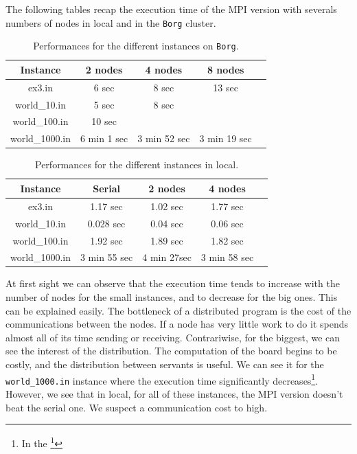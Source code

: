 \documentclass[a4paper,10pt]{article}
\begin{document}
The following tables recap the execution time of the MPI version with severals numbers of nodes in local and in the \texttt{Borg} cluster.
\begin{table}[!ht]
\centering
\begin{tabular}{|c||c|c|c|c|}
  \hline
    Instance     &  2 nodes   & 4 nodes  & 8 nodes  \\
  \hline
    ex3.in       &    6 sec       & 8 sec       &  13 sec \\ 
  \hline
    world\_10.in &    5 sec      & 8 sec      &  \\ 
  \hline
   world\_100.in &    10 sec     &      &  \\ 
  \hline
  world\_1000.in &     6 min 1 sec   & 3 min 52 sec      & 3 min 19 sec  \\ 
  \hline
\end{tabular}
\caption{Performances for the different instances on \texttt{Borg}.}
\end{table}

\begin{table}[!ht]
\centering
\begin{tabular}{|c||c|c|c|c|}
  \hline
    Instance     & Serial   & 2 nodes   & 4 nodes   \\
  \hline
    ex3.in       &    1.17 sec   &  1.02 sec  & 1.77 sec  \\ 
  \hline
    world\_10.in &    0.028 sec   &  0.04 sec      & 0.06 sec   \\ 
  \hline
   world\_100.in &    1.92 sec   &   1.89 sec     &  1.82 sec   \\ 
  \hline
  world\_1000.in &    3 min 55 sec  &    4 min 27sec   & 3 min 58 sec   \\ 
  \hline
\end{tabular}
\caption{Performances for the different instances in local.}
\end{table}


At first sight we can observe that the execution time tends to increase with the number of nodes for the small instances, and
to decrease for the big ones. This can be explained easily. The bottleneck of a distributed program is the cost of the communications
between the nodes. If a node has very little work to do it spends almost all of its time sending or receiving.
Contrariwise, for the biggest, we can see the interest of the distribution. The computation of the board begins to be costly, and
the distribution between servants is useful. We can see it for the \texttt{world\_1000.in} instance where the execution time
significantly decreases\footnote{In the \footnote{Cluster}}. However, we see that in local, for all of these instances, the MPI version doesn't beat the serial one.
We suspect a communication cost to high.
\\
\end{document}
